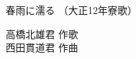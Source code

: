 \documentclass[10pt,b5j]{tarticle} %
\begin{document}
\begin{minipage}[c]{0.7\hsize} %
    \begin{center}
        {\LARGE
            春雨に濡る %
        }
        {\small 
            （大正12年寮歌） %
        }
    \end{center}
\end{minipage}
\begin{minipage}[c]{0.3\hsize} %
    \begin{flushright} %
        高橋北雄君 作歌\\西田貫道君 作曲 %
    \end{flushright}
\end{minipage}
\end{document}
